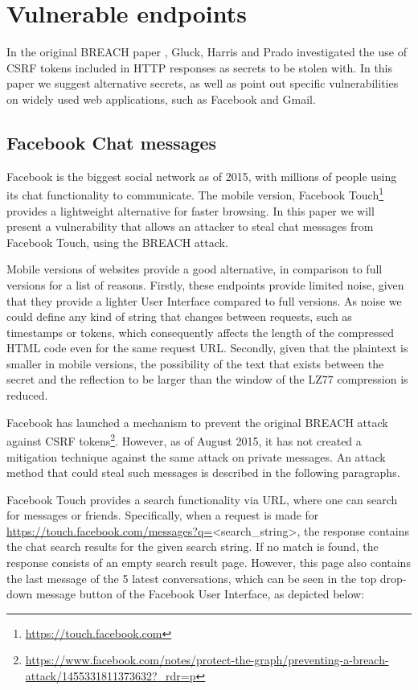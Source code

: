 \section{Vulnerable endpoints}\label{sec:vulnerabilities}

In the original BREACH paper \cite{breach}, Gluck, Harris and Prado investigated
the use of CSRF tokens included in HTTP responses as secrets to be stolen with.
In this paper we suggest alternative secrets, as well as point out specific
vulnerabilities on widely used web applications, such as Facebook and Gmail.

\subsection{Facebook Chat messages}\label{subsec:fb}

Facebook is the biggest social network as of 2015, with millions of people using
its chat functionality to communicate. The mobile version, Facebook
Touch\footnote{\url{https://touch.facebook.com}} provides a lightweight
alternative for faster browsing. In this paper we will present a vulnerability
that allows an attacker to steal chat messages from Facebook Touch, using the
BREACH attack.

Mobile versions of websites provide a good alternative, in comparison to full
versions for a list of reasons. Firstly, these endpoints provide limited noise,
given that they provide a lighter User Interface compared to full versions. As
noise we could define any kind of string that changes between requests, such as
timestamps or tokens, which consequently affects the length of the compressed
HTML code even for the same request URL. Secondly, given that the plaintext is
smaller in mobile versions, the possibility of the text that exists between the
secret and the reflection to be larger than the window of the LZ77 compression
is reduced.

Facebook has launched a mechanism to prevent the original BREACH attack against
CSRF
tokens\footnote{\url{https://www.facebook.com/notes/protect-the-graph/preventing-a-breach-attack/1455331811373632?_rdr=p}}.
However, as of August 2015, it has not created a mitigation technique against
the same attack on private messages. An attack method that could steal such
messages is described in the following paragraphs.

Facebook Touch provides a search functionality via URL, where one can search for
messages or friends. Specifically, when a request is made for
\url{https://touch.facebook.com/messages?q=}<search\_string>, the response
contains the chat search results for the given search string. If no match is
found, the response consists of an empty search result page. However, this page
also contains the last message of the 5 latest conversations, which can be seen
in the top drop-down message button of the Facebook User Interface, as depicted
below:

